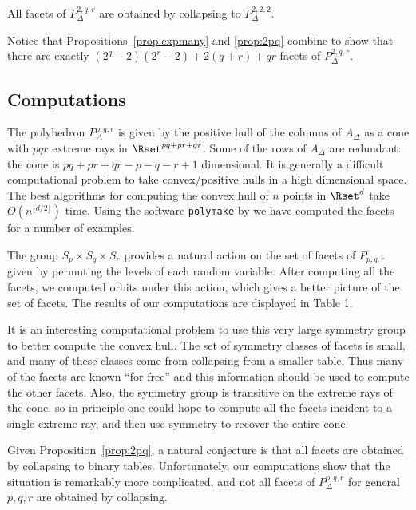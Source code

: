 \documentclass{elsart}
\begin{document}
\begin{prop}\label{prop:2pq}
All facets of $P_\Delta^{2,q,r}$  are obtained by collapsing to
$P_\Delta^{2,2,2}$.
\end{prop}

Notice that Propositions~\ref{prop:expmany} and \ref{prop:2pq}
combine to show that there are exactly
$(2^q-2)(2^r-2) + 2(q+r) + qr$ facets of $P_\Delta^{2,q,r}$.

\subsection{Computations}
The polyhedron $P_\Delta^{p,q,r}$ is given by the positive hull of the
columns of $A_\Delta$ as a cone with $pqr$ extreme rays in $\Rset^{pq
+ pr + qr}$.  Some of the rows of $A_\Delta$ are redundant: the
cone is $pq + pr + qr - p - q -r+ 1$ dimensional.  It is
generally a difficult computational problem to take convex/positive hulls in a
high dimensional space.  The best algorithms for computing the convex
hull of $n$ points in $\Rset^d$ take $O(n^{\lfloor d/2\rfloor})$ time.
Using the software {\tt polymake} by \citet{polymake}
we have computed the facets for a number of
examples. 

 The group $S_p \times S_q \times S_r$ provides a natural
action on the set of facets
of $P_{p,q,r}$ given by permuting the levels of
each random variable.  After computing all the facets, we computed
orbits under this action, which gives a better picture of the set of
facets.  The results of our computations are displayed in Table 1.

It is an interesting computational problem to use this very large
symmetry group to better compute the convex hull.  The set of symmetry
classes of facets is small, and many of these classes come from
collapsing from a smaller table.  Thus many of the facets are known
``for free'' and this information should be used to compute the other
facets.  Also, the symmetry group is transitive on the extreme rays of
the cone, so in principle one could hope to compute all the facets
incident to a single extreme ray, and then use symmetry to recover the
entire cone.

Given Proposition~\ref{prop:2pq},  a natural conjecture is that
all facets are obtained by collapsing to binary tables. Unfortunately,
our computations show that the situation is remarkably more
complicated, and not all
facets of $P_\Delta^{p,q,r}$ for general $p,q,r$ are obtained by
collapsing.
\end{document}
